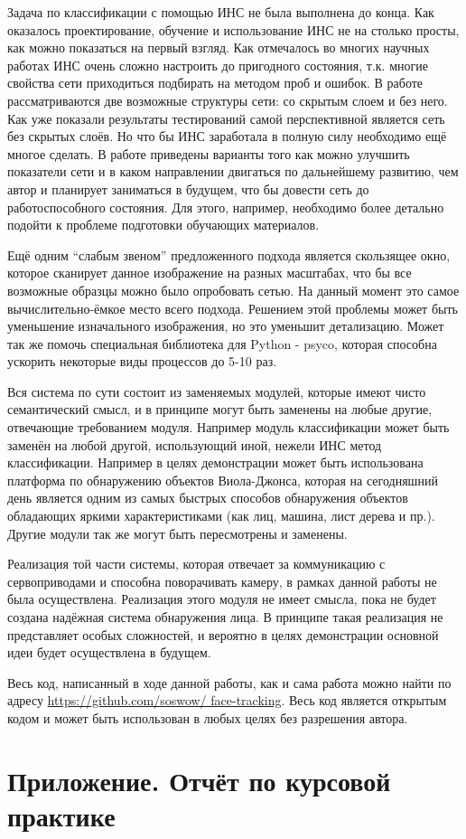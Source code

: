 \documentclass[12pt]{report}
\begin{document}
Задача по классификации с помощью ИНС не была выполнена до конца. Как оказалось проектирование, обучение и 
использование ИНС не на столько просты, как можно показаться на первый взгляд. Как отмечалось во многих научных 
работах ИНС очень сложно настроить до пригодного состояния, т.к. многие свойства сети приходиться подбирать на 
методом проб и ошибок. В работе рассматриваются две возможные структуры сети: со скрытым слоем и без него. Как уже 
показали результаты тестирований самой перспективной является сеть без скрытых слоёв. Но что бы ИНС заработала в 
полную силу необходимо ещё многое сделать. В работе приведены варианты того как можно улучшить показатели сети и в 
каком направлении двигаться по дальнейшему развитию, чем автор и планирует заниматься в будущем, что бы довести 
сеть до работоспособного состояния. Для этого, например, необходимо более детально подойти к проблеме подготовки 
обучающих материалов.

Ещё одним ``слабым звеном'' предложенного подхода является скользящее окно, которое сканирует данное изображение на 
разных масштабах, что бы все возможные образцы можно было опробовать сетью. На данный момент это самое 
вычислительно-ёмкое место всего подхода. Решением этой проблемы может быть уменьшение изначального изображения, но 
это уменьшит детализацию. Может так же помочь специальная библиотека для Python - psyco, которая способна ускорить 
некоторые виды процессов до 5-10 раз.

Вся система по сути состоит из заменяемых модулей, которые имеют чисто семантический смысл, и в принципе могут быть 
заменены на любые другие, отвечающие требованием модуля. Например модуль классификации может быть заменён на любой 
другой, использующий иной, нежели ИНС метод классификации. Например в целях демонстрации может быть использована 
платформа по обнаружению объектов Виола-Джонса, которая на сегодняшний день является одним из самых быстрых 
способов обнаружения объектов обладающих яркими характеристиками (как лиц, машина, лист дерева и пр.). Другие 
модули так же могут быть пересмотрены и заменены.

Реализация той части системы, которая отвечает за коммуникацию с сервоприводами и способна поворачивать камеру, в 
рамках данной работы не была осуществлена. Реализация этого модуля не имеет смысла, пока не будет создана надёжная 
система обнаружения лица. В принципе такая реализация не представляет особых сложностей, и вероятно в целях 
демонстрации основной идеи будет осуществлена в будущем. 

Весь код, написанный в ходе данной работы, как и сама работа можно найти по адресу \url{https://github.com/soswow/
face-tracking}. Весь код является открытым кодом и может быть использован в любых целях без разрешения автора.

\appendix
\chapter{Приложение. Отчёт по курсовой практике}









\end{document}
